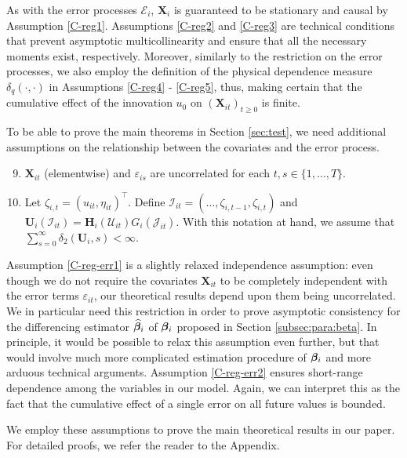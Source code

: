 \documentclass[a4paper,12pt]{article}
\begin{document}
As with the error processes $\mathcal{E}_i$, $\mathbf{X}_i$ is guaranteed to be stationary and causal by Assumption \ref{C-reg1}. Assumptions \ref{C-reg2} and \ref{C-reg3} are technical conditions that prevent asymptotic multicollinearity and ensure that all the necessary moments exist, respectively. Moreover, similarly to the restriction on the error processes, we also employ the definition of the physical dependence measure $ \delta_{q}(\cdot, \cdot)$ in Assumptions \ref{C-reg4} - \ref{C-reg5}, thus, making certain that the cumulative effect of the innovation $u_0$ on $(\mathbf{X}_{it})_{t\geq 0}$ is finite. 



To be able to prove the main theorems in Section \ref{sec:test}, we need additional assumptions on the relationship between the covariates and the error process.

\begin{enumerate}[label=(C\arabic*),leftmargin=1.05cm]
\setcounter{enumi}{8}
\item \label{C-reg-err1} $\mathbf{X}_{it}$ (elementwise) and $\varepsilon_{is}$ are uncorrelated for each $t, s\in \{1, \ldots, T\}$.
\item \label{C-reg-err2} Let $\zeta_{i, t} = (u_{it}, \eta_{it})^\top$. Define $\mathcal{I}_{it} = (\ldots, \zeta_{i, t-1}, \zeta_{i, t})$ and $\mathbf{U}_i(\mathcal{I}_{it}) =  \mathbf{H}_i(\mathcal{U}_{it})G_i(\mathcal{J}_{it})$. With this notation at hand, we assume that $\sum_{s=0}^\infty \delta_2(\mathbf{U}_i, s)<\infty$.

\end{enumerate}
Assumption \ref{C-reg-err1} is a slightly relaxed independence assumption: even though we do not require the covariates $\mathbf{X}_{it}$ to be completely independent with the error terms $\varepsilon_{it}$, our theoretical results depend upon them being uncorrelated. We in particular need this restriction in order to prove asymptotic consistency for the differencing estimator $\widehat{\bm{\beta}}_i$ of $\bm{\beta}_i$ proposed in Section \ref{subsec:para:beta}. In principle, it would be possible to relax this assumption even further, but that would involve much more complicated estimation procedure of $\bm{\beta}_i$ and more arduous technical arguments. Assumption \ref{C-reg-err2} ensures short-range dependence among the variables in our model. Again, we can interpret this as the fact that the cumulative effect of a single error on all future values is bounded.

We employ these assumptions to prove the main theoretical results in our paper. For detailed proofs, we refer the reader to the Appendix.
\end{document}
